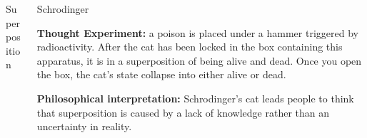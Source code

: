 \documentclass[final, 20pt]{beamer}
\newlength{\onecolwid}
\newlength{\twocolwid}
\begin{document}
\begin{frame}[t]
\begin{columns}[t]
\begin{column}{\twocolwid}
\begin{columns}[t,totalwidth=\twocolwid]
\begin{column}{\onecolwid}
\begin{block}{Superposition}
\end{block}


\end{column} %

\begin{column}{\onecolwid}\vspace{-.6in} %


\begin{block}{Schrodinger}

\textbf{Thought Experiment:} a poison is placed under a hammer triggered by radioactivity. After the cat has been locked in the box containing this apparatus, it is in a superposition of being alive and dead. Once you open the box, the cat's state collapse into either alive or dead.

\textbf{Philosophical interpretation:} Schrodinger's cat leads people to think that superposition is caused by a lack of knowledge rather than an
 uncertainty in reality.


\end{block}


\end{column} %

\end{columns} %

\begin{columns}[t,totalwidth=\twocolwid] %

\begin{column}{\onecolwid} %


\end{column}
\end{columns}
\end{column}
\end{columns}
\end{frame}
\end{document}
